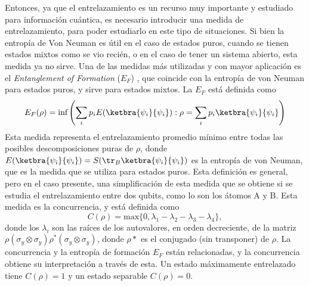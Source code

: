 Entonces, ya que el entrelazamiento es un recurso muy importante y estudiado para información cuántica, es necesario introducir una medida de entrelazamiento, para poder estudiarlo en este tipo de situaciones. Si bien la entropía de Von Neuman es útil en el caso de estados puros, cuando se tienen estados mixtos como se vio recién, o en el caso de tener un sistema abierto, esta medida ya no sirve. Una de las medidas más utilizadas y con mayor aplicación es el \textit{Entanglement of Formation} ($E_F$) \cite{Plenio2006}, que coincide con la entropía de von Neuman para estados puros, y sirve para estados mixtos. La $E_F$ está definida como
\begin{equation}
    E_F(\rho)=\text{inf}\left( \sum_i p_i E(\ketbra{\psi_i}{\psi_i}) : \rho = \sum_i p_i\ketbra{\psi_i}{\psi_i}\right)
\end{equation}
Esta medida representa el entrelazamiento promedio mínimo entre todas las posibles descomposiciones puras de $\rho$, donde $E(\ketbra{\psi_i}{\psi_i})=S(\tr_B{\ketbra{\psi_i}{\psi_i}})$ es la entropía de von Neuman, que es la medida que se utiliza para estados puros. Esta definición es general, pero en el caso presente, una simplificación de esta medida que se obtiene si se estudia el entrelazamiento entre dos qubits, como lo son los átomos A y B. Esta medida es la concurrencia, y está definida como
\begin{equation}
    C(\rho)=\text{max}\{0,\lambda_1-\lambda_2-\lambda_3-\lambda_4\},
    \label{ec4:concurrencia}
\end{equation}
donde los $\lambda_i$ son las raíces de los autovalores, en orden decreciente, de la matriz \newline $\rho(\sigma_y\otimes\sigma_y)\rho^*(\sigma_y\otimes\sigma_y)$, donde $\rho*$ es el conjugado (sin transponer) de $\rho$. La concurrencia y la entropía de formación $E_F$ están relacionadas, y la concurrencia obtiene su interpretación a través de esta. Un estado máximamente entrelazado tiene $C(\rho)=1$ y un estado separable $C(\rho)=0$. 


